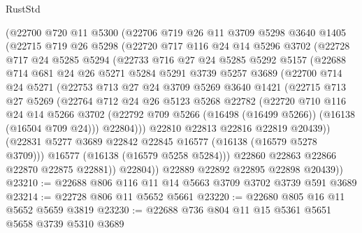 \begin{lexlean}{RustStd}
\begin{coremodule}
    (@22700
      @720
      @11
      @5300
      (@22706
        @719
        @26
        @11
        @3709
        @5298
        @3640
        @1405
        (@22715
          @719
          @26
          @5298
          (@22720
            @717
            @116
            @24
            @14
            @5296
            @3702
            (@22728
              @717
              @24
              @5285
              @5294
              (@22733
                @716
                @27
                @24
                @5285
                @5292
                @5157
                (@22688
                  @714
                  @681
                  @24
                  @26
                  @5271
                  @5284
                  @5291
                  @3739
                  @5257
                  @3689
                  (@22700
                    @714
                    @24
                    @5271
                    (@22753
                      @713
                      @27
                      @24
                      @3709
                      @5269
                      @3640
                      @1421
                      (@22715
                        @713
                        @27
                        @5269
                        (@22764
                          @712
                          @24
                          @26
                          @5123
                          @5268
                          @22782
                          (@22720
                            @710
                            @116
                            @24
                            @14
                            @5266
                            @3702
                            (@22792 @709 @5266 (@16498 (@16499 @5266)) (@16138 (@16504 @709 @24)))
                            @22804)))
                      @22810
                      @22813
                      @22816
                      @22819
                      @20439))
                  (@22831 @5277 @3689 @22842 @22845 @16577 (@16138 (@16579 @5278 @3709)))
                  @16577
                  (@16138 (@16579 @5258 @5284)))
                @22860
                @22863
                @22866
                @22870
                @22875
                @22881))
            @22804))
        @22889
        @22892
        @22895
        @22898
        @20439))
@23210 := @22688 @806 @116 @11 @14 @5663 @3709 @3702 @3739 @591 @3689
@23214 := @22728 @806 @11 @5652 @5661
@23220 := @22680 @805 @16 @11 @5652 @5659 @3819
@23230 := @22688 @736 @804 @11 @15 @5361 @5651 @5658 @3739 @5310 @3689

\end{coremodule}
\end{lexlean}
